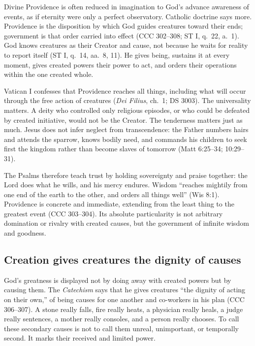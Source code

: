 Divine Providence is often reduced in imagination to God's advance awareness of events, as if eternity were only a perfect observatory. Catholic doctrine says more. Providence is the disposition by which God guides creatures toward their ends; government is that order carried into effect (CCC 302--308; ST I, q.~22, a.~1). God knows creatures as their Creator and cause, not because he waits for reality to report itself (ST I, q.~14, aa.~8, 11). He gives being, sustains it at every moment, gives created powers their power to act, and orders their operations within the one created whole.

Vatican I confesses that Providence reaches all things, including what will occur through the free action of creatures (\emph{Dei Filius}, ch.~1; DS 3003). The universality matters. A deity who controlled only religious episodes, or who could be defeated by created initiative, would not be the Creator. The tenderness matters just as much. Jesus does not infer neglect from transcendence: the Father numbers hairs and attends the sparrow, knows bodily need, and commands his children to seek first the kingdom rather than become slaves of tomorrow (Matt 6:25--34; 10:29--31).

The Psalms therefore teach trust by holding sovereignty and praise together: the Lord does what he wills, and his mercy endures. Wisdom ``reaches mightily from one end of the earth to the other, and orders all things well'' (Wis 8:1). Providence is concrete and immediate, extending from the least thing to the greatest event (CCC 303--304). Its absolute particularity is not arbitrary domination or rivalry with created causes, but the government of infinite wisdom and goodness.

\subsection{Creation gives creatures the dignity of causes}

God's greatness is displayed not by doing away with created powers but by causing them. The \emph{Catechism} says that he gives creatures ``the dignity of acting on their own,'' of being causes for one another and co-workers in his plan (CCC 306--307). A stone really falls, fire really heats, a physician really heals, a judge really sentences, a mother really consoles, and a person really chooses. To call these secondary causes is not to call them unreal, unimportant, or temporally second. It marks their received and limited power.

